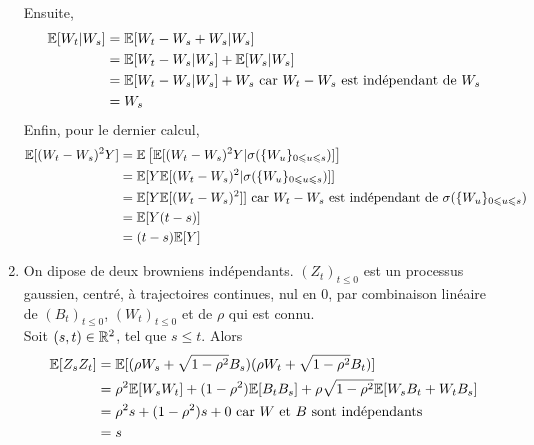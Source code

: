 \begin{enumerate}
      Ensuite,
      \begin{equation*}
      \begin{split}
        \mathbb{E}[W_t\vert W_s] &= \mathbb{E}[W_t - W_s + W_s \vert W_s] \\
        &= \mathbb{E}[W_t - W_s \vert W_s] + \mathbb{E}[W_s \vert W_s] \\
        &= \mathbb{E}[W_t - W_s \vert W_s] + W_s \text{ car } W_t - W_s \text{ est indépendant de } W_s \\
        &= W_s
      \end{split}
      \end{equation*}
      Enfin, pour le dernier calcul,
      \renewcommand{\wu}{W_u}
      \begin{equation*}
      \begin{split}
        \E[(\wt-\ws)^2 Y] &= \E\left[\E[(\wt-\ws)^2 Y \vert \sigma(\{\wu\}_{0\leq u \leq s})]\right] \\
        &= \E[Y\E[(\wt-\ws)^2 \vert \sigma(\{\wu\}_{0\leq u \leq s})]] \\
        &= \E[Y \E[(\wt - \ws)^2]] \text{ car } \wt - \ws \text{ est indépendant de }\sigma(\{\wu\}_{0\leq u \leq s})\\
        &= \E[Y(t-s)] \\
        &= (t-s)\E[Y]
      \end{split}
      \end{equation*}
    \item On dipose de deux browniens indépendants. $(Z_t)_{t\leq 0}$ est un processus gaussien, centré, à trajectoires continues, nul en 0, par combinaison linéaire de $(B_t)_{t\leq 0}$, $(W_t)_{t \leq 0}$ et de $\rho$ qui est connu. \\

      \newcommand{\bs}{B_s}
      \newcommand{\bt}{B_t}
      Soit $(s,t) \in \mathbb{R}^2$, tel que $s \leq t$. Alors
      \begin{equation*}
      \begin{split}
        \E[Z_sZ_t] &= \E[(\rho\ws+\sqrt{1-\rho^2}\bs)(\rho\wt+\sqrt{1-\rho^2}\bt)] \\
        &= \rho^2 \E[\ws\wt] + (1-\rho^2)\E[\bt\bs] + \rho\sqrt{1-\rho^2} \E[\ws\bt + \wt\bs]\\
        &= \rho^2s + (1-\rho^2)s + 0 \text{ car } W \text{ et } B \text{ sont indépendants}\\
        &= s
      \end{split}
      \end{equation*}
\end{enumerate}

